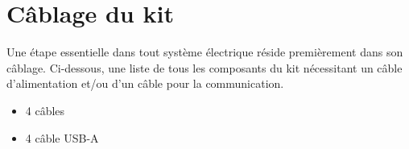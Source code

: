 \section{Câblage du kit}
Une étape essentielle dans tout système électrique réside premièrement dans son câblage. Ci-dessous, une liste de tous les composants du kit nécessitant un câble d'alimentation et/ou d'un câble pour la communication.
\begin{itemize}
    \item 4 câbles
    \item 4 câble USB-A
\end{itemize}